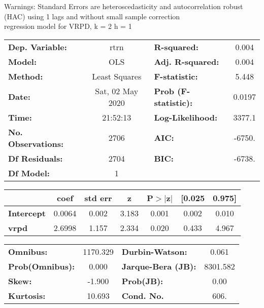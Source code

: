 Warnings: \newline
 [1] Standard Errors are heteroscedasticity and autocorrelation robust (HAC) using 1 lags and without small sample correction\\ 

regression model for VRPD, k = 2 h = 1\begin{center}
\begin{tabular}{lclc}
\toprule
\textbf{Dep. Variable:}    &       rtrn       & \textbf{  R-squared:         } &     0.004   \\
\textbf{Model:}            &       OLS        & \textbf{  Adj. R-squared:    } &     0.004   \\
\textbf{Method:}           &  Least Squares   & \textbf{  F-statistic:       } &     5.448   \\
\textbf{Date:}             & Sat, 02 May 2020 & \textbf{  Prob (F-statistic):} &   0.0197    \\
\textbf{Time:}             &     21:52:13     & \textbf{  Log-Likelihood:    } &    3377.1   \\
\textbf{No. Observations:} &        2706      & \textbf{  AIC:               } &    -6750.   \\
\textbf{Df Residuals:}     &        2704      & \textbf{  BIC:               } &    -6738.   \\
\textbf{Df Model:}         &           1      & \textbf{                     } &             \\
\bottomrule
\end{tabular}
\begin{tabular}{lcccccc}
                   & \textbf{coef} & \textbf{std err} & \textbf{z} & \textbf{P$> |$z$|$} & \textbf{[0.025} & \textbf{0.975]}  \\
\midrule
\textbf{Intercept} &       0.0064  &        0.002     &     3.183  &         0.001        &        0.002    &        0.010     \\
\textbf{vrpd}      &       2.6998  &        1.157     &     2.334  &         0.020        &        0.433    &        4.967     \\
\bottomrule
\end{tabular}
\begin{tabular}{lclc}
\textbf{Omnibus:}       & 1170.329 & \textbf{  Durbin-Watson:     } &    0.061  \\
\textbf{Prob(Omnibus):} &   0.000  & \textbf{  Jarque-Bera (JB):  } & 8301.582  \\
\textbf{Skew:}          &  -1.900  & \textbf{  Prob(JB):          } &     0.00  \\
\textbf{Kurtosis:}      &  10.693  & \textbf{  Cond. No.          } &     606.  \\
\bottomrule
\end{tabular}
\end{center}

